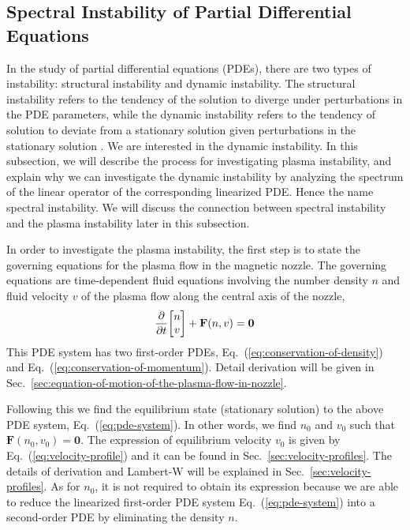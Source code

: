 \subsection{Spectral Instability of Partial Differential Equations}
In the study of partial differential equations (PDEs), there are two types of instability: structural instability and dynamic instability. The structural instability refers to the tendency of the solution to diverge under perturbations in the PDE parameters, while the dynamic instability refers to the tendency of solution to deviate from a stationary solution given perturbations in the stationary solution \cite{beck_spectral_2020}. We are interested in the dynamic instability. In this subsection, we will describe the process for investigating plasma instability, and explain why we can investigate the dynamic instability by analyzing the spectrum of the linear operator of the corresponding linearized PDE. Hence the name spectral instability. We will discuss the connection between spectral instability and the plasma instability later in this subsection.

In order to investigate the plasma instability, the first step is to state the governing equations for the plasma flow in the magnetic nozzle. The governing equations are time-dependent fluid equations involving the number density $n$ and fluid velocity $v$ of the plasma flow along the central axis of the nozzle,
\begin{equation}
	\pdv{t}\mqty[n\\ v] + \mathbf{F}(n,v) = \mathbf{0}
	\label{eq:pde-system}
\end{equation}
This PDE system has two first-order PDEs, Eq.~(\ref{eq:conservation-of-density}) and Eq.~(\ref{eq:conservation-of-momentum}). Detail derivation will be given in Sec.~\ref{sec:equation-of-motion-of-the-plasma-flow-in-nozzle}.

Following this we find the equilibrium state (stationary solution) to the above PDE system, Eq.~(\ref{eq:pde-system}). In other words, we find $n_0$ and $v_0$ such that $\mathbf{F}(n_0,v_0)=\mathbf{0}$. The expression of equilibrium velocity $v_0$ is given by Eq.~(\ref{eq:velocity-profile}) and it can be found in Sec.~\ref{sec:velocity-profiles}. The details of derivation and Lambert-W will be explained in Sec.~\ref{sec:velocity-profiles}. As for $n_0$, it is not required to obtain its expression because we are able to reduce the linearized first-order PDE system Eq.~(\ref{eq:pde-system}) into a second-order PDE by eliminating the density $n$.

